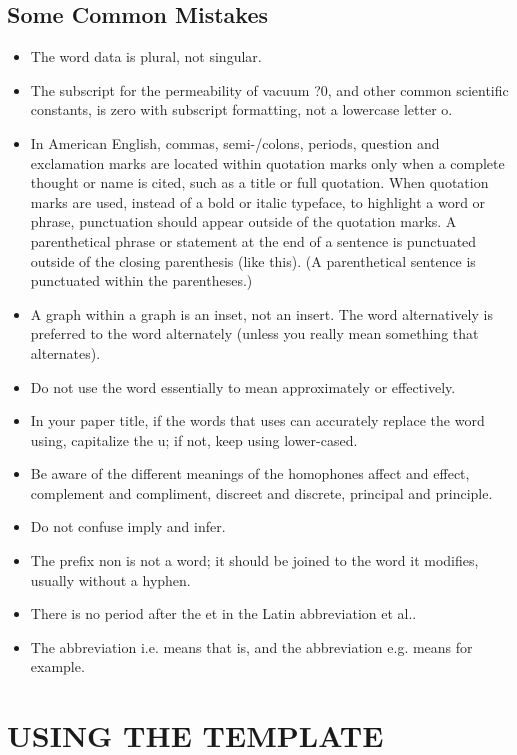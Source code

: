 \documentclass[letterpaper, 10 pt, conference]{ieeeconf}  %
\begin{document}
\subsection{Some Common Mistakes}
\begin{itemize}


\item The word data is plural, not singular.
\item The subscript for the permeability of vacuum ?0, and other common scientific constants, is zero with subscript formatting, not a lowercase letter o.
\item In American English, commas, semi-/colons, periods, question and exclamation marks are located within quotation marks only when a complete thought or name is cited, such as a title or full quotation. When quotation marks are used, instead of a bold or italic typeface, to highlight a word or phrase, punctuation should appear outside of the quotation marks. A parenthetical phrase or statement at the end of a sentence is punctuated outside of the closing parenthesis (like this). (A parenthetical sentence is punctuated within the parentheses.)
\item A graph within a graph is an inset, not an insert. The word alternatively is preferred to the word alternately (unless you really mean something that alternates).
\item Do not use the word essentially to mean approximately or effectively.
\item In your paper title, if the words that uses can accurately replace the word using, capitalize the u; if not, keep using lower-cased.
\item Be aware of the different meanings of the homophones affect and effect, complement and compliment, discreet and discrete, principal and principle.
\item Do not confuse imply and infer.
\item The prefix non is not a word; it should be joined to the word it modifies, usually without a hyphen.
\item There is no period after the et in the Latin abbreviation et al..
\item The abbreviation i.e. means that is, and the abbreviation e.g. means for example.

\end{itemize}


\section{USING THE TEMPLATE}
\end{document}
